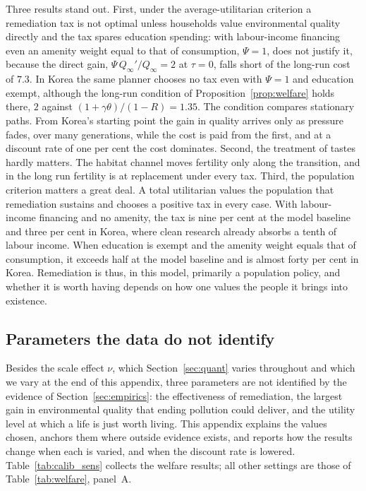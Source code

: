 \documentclass[11pt]{article}
\begin{document}
Three results stand out. First, under the average-utilitarian criterion a remediation tax is not optimal
unless households value environmental quality directly and the tax spares education spending: with
labour-income financing even an amenity weight equal to that of consumption, $\Psi=1$, does not justify
it, because the direct gain, $\Psi\,Q_\infty'/Q_\infty=2$ at $\tau=0$, falls short of the long-run cost of
$7.3$. In Korea the same planner chooses no tax even with $\Psi=1$ and education exempt, although the long-run
condition of Proposition~\ref{prop:welfare} holds there, $2$ against $(1+\gamma\theta)/(1-R)=1.35$. The condition compares
stationary paths. From Korea's starting point the gain in quality arrives only as pressure fades, over
many generations, while the cost is paid from the first, and at a discount rate of one per cent the cost
dominates. Second, the treatment of tastes hardly matters. The habitat channel moves fertility only along the
transition, and in the long run fertility is at replacement under every tax. Third, the population
criterion matters a great deal. A total utilitarian values the population that remediation sustains and
chooses a positive tax in every case. With labour-income financing and no amenity, the tax is nine per
cent at the model baseline and three per cent in Korea, where clean research already absorbs a tenth of
labour income. When education is exempt and the amenity weight equals that of consumption, it exceeds half at the
model baseline and is almost forty per cent in Korea. Remediation is thus, in this model, primarily a
population policy, and whether it is worth having depends on how one values the people it brings into
existence.

\subsection{Parameters the data do not identify}
\label{app:calib}

Besides the scale effect $\nu$, which Section~\ref{sec:quant} varies throughout and which we vary at the
end of this appendix, three parameters are not identified by the evidence of Section~\ref{sec:empirics}: the effectiveness of remediation, the largest gain in environmental quality
that ending pollution could deliver, and the utility level at which a life is just worth living. This
appendix explains the values chosen, anchors them where outside evidence exists, and reports how the
results change when each is varied, and when the discount rate is lowered. Table~\ref{tab:calib_sens} collects the welfare results; all other
settings are those of Table~\ref{tab:welfare}, panel~A.
\end{document}
